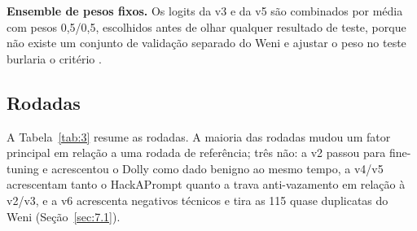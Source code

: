 \documentclass[11pt]{article}
\begin{document}
\textbf{Ensemble de pesos fixos.} Os logits da v3 e da v5 são combinados por média com pesos 0,5/0,5, escolhidos antes de olhar qualquer resultado de teste, porque não existe um conjunto de validação separado do Weni e ajustar o peso no teste burlaria o critério%
.

\subsection{Rodadas}\label{sec:3.6}

A Tabela~\ref{tab:3} resume as rodadas. A maioria das rodadas mudou um fator principal em relação a uma rodada de referência; três não: a v2 passou para fine-tuning e acrescentou o Dolly como dado benigno ao mesmo tempo, a v4/v5 acrescentam tanto o HackAPrompt quanto a trava anti-vazamento em relação à v2/v3, e a v6 acrescenta negativos técnicos e tira as 115 quase duplicatas do Weni (Seção~\ref{sec:7.1}).
\end{document}
